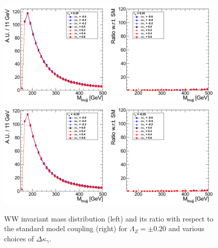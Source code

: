 \begin{figure}[h!t]
  {\centering
    \includegraphics[width=0.48\textwidth]{figs/Mass4Body_020.png}
    \includegraphics[width=0.48\textwidth]{figs/Mass4Body_020_ratio.png}
    \includegraphics[width=0.48\textwidth]{figs/Mass4Body_m020.png}
    \includegraphics[width=0.48\textwidth]{figs/Mass4Body_m020_ratio.png}
    \caption{WW invariant mass distribution (left) and its ratio with respect to 
    the standard model coupling (right) for $\Lambda_Z = \pm 0.20$ and various choices of $\Delta{\kappa_\gamma}$.}
    \label{fig:ww_Mass4Body_atgcRatio020}}
\end{figure}
